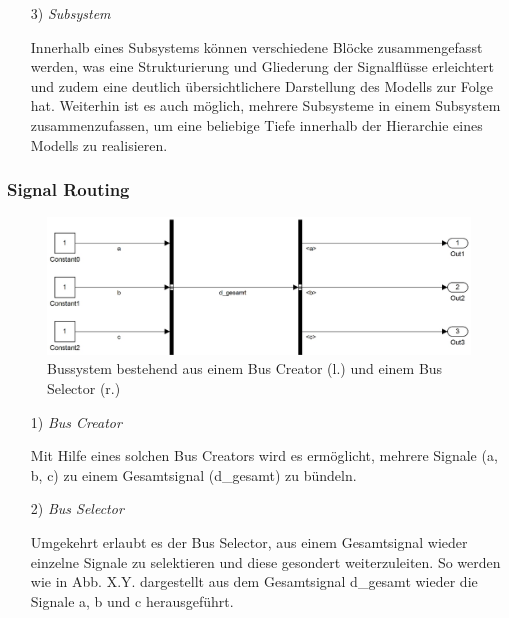 \documentclass[fontsize = 12pt, paper = a4]{scrreprt}
\begin{document}
\begin{itemize}
\item[3)] \textit{Subsystem}

Innerhalb eines Subsystems können verschiedene Blöcke zusammengefasst werden, was eine Strukturierung und Gliederung der Signalflüsse erleichtert und zudem eine deutlich übersichtlichere Darstellung des Modells zur Folge hat. Weiterhin ist es auch möglich, mehrere Subsysteme in einem Subsystem zusammenzufassen, um eine beliebige Tiefe innerhalb der Hierarchie eines Modells zu realisieren. \\

\end{itemize}



\subsubsection{Signal Routing}

\begin{figure}[h]
\centering
\includegraphics[scale = 0.45]{bus_gesamt}
\caption{Bussystem bestehend aus einem Bus Creator (l.) und einem Bus Selector (r.)}
\end{figure}

\newpage

\begin{itemize}

\item[1)] \textit{Bus Creator}

Mit Hilfe eines solchen Bus Creators wird es ermöglicht, mehrere Signale (a, b, c) zu einem Gesamtsignal (d\_gesamt) zu bündeln.

\item[2)] \textit{Bus Selector}

Umgekehrt erlaubt es der Bus Selector, aus einem Gesamtsignal wieder einzelne Signale zu selektieren und diese gesondert weiterzuleiten. So werden wie in Abb. X.Y. dargestellt aus dem Gesamtsignal d\_gesamt wieder die Signale a, b und c herausgeführt. \\

\end{itemize}
\end{document}
